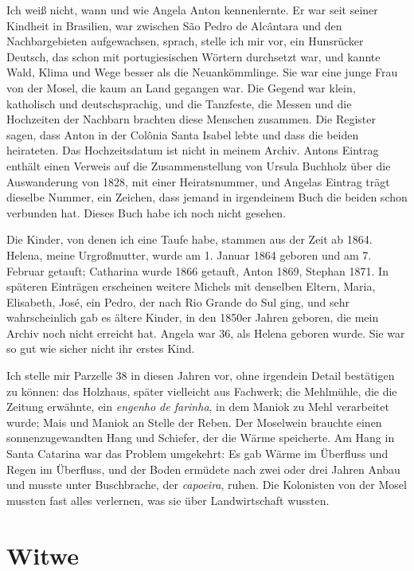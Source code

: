 \documentclass[
  ngerman,
  11pt,
  openany]{book}
\begin{document}
Ich weiß nicht, wann und wie Angela Anton kennenlernte. Er war seit
seiner Kindheit in Brasilien, war zwischen São Pedro de Alcântara und
den Nachbargebieten aufgewachsen, sprach, stelle ich mir vor, ein
Hunsrücker Deutsch, das schon mit portugiesischen Wörtern durchsetzt
war, und kannte Wald, Klima und Wege besser als die Neuankömmlinge. Sie
war eine junge Frau von der Mosel, die kaum an Land gegangen war. Die
Gegend war klein, katholisch und deutschsprachig, und die Tanzfeste, die
Messen und die Hochzeiten der Nachbarn brachten diese Menschen zusammen.
Die Register sagen, dass Anton in der Colônia Santa Isabel lebte und
dass die beiden heirateten. Das Hochzeitsdatum ist nicht in meinem
Archiv. Antons Eintrag enthält einen Verweis auf die Zusammenstellung
von Ursula Buchholz über die Auswanderung von 1828, mit einer
Heiratsnummer, und Angelas Eintrag trägt dieselbe Nummer, ein Zeichen,
dass jemand in irgendeinem Buch die beiden schon verbunden hat. Dieses
Buch habe ich noch nicht gesehen.

Die Kinder, von denen ich eine Taufe habe, stammen aus der Zeit ab 1864.
Helena, meine Urgroßmutter, wurde am 1. Januar 1864 geboren und am 7.
Februar getauft; Catharina wurde 1866 getauft, Anton 1869, Stephan 1871.
In späteren Einträgen erscheinen weitere Michels mit denselben Eltern,
Maria, Elisabeth, José, ein Pedro, der nach Rio Grande do Sul ging, und
sehr wahrscheinlich gab es ältere Kinder, in den 1850er Jahren geboren,
die mein Archiv noch nicht erreicht hat. Angela war 36, als Helena
geboren wurde. Sie war so gut wie sicher nicht ihr erstes Kind.

Ich stelle mir Parzelle 38 in diesen Jahren vor, ohne irgendein Detail
bestätigen zu können: das Holzhaus, später vielleicht aus Fachwerk; die
Mehlmühle, die die Zeitung erwähnte, ein \emph{engenho de farinha}, in
dem Maniok zu Mehl verarbeitet wurde; Mais und Maniok an Stelle der
Reben. Der Moselwein brauchte einen sonnenzugewandten Hang und Schiefer,
der die Wärme speicherte. Am Hang in Santa Catarina war das Problem
umgekehrt: Es gab Wärme im Überfluss und Regen im Überfluss, und der
Boden ermüdete nach zwei oder drei Jahren Anbau und musste unter
Buschbrache, der \emph{capoeira}, ruhen. Die Kolonisten von der Mosel
mussten fast alles verlernen, was sie über Landwirtschaft wussten.

\section{Witwe}\label{witwe}
\end{document}
